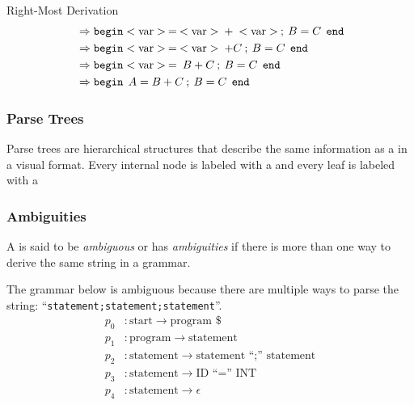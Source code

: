 \begin{example}[]{Right-Most Derivation}
\begin{align*}
                          &\Rightarrow \mathtt{begin} <\text{var}> \: = \: <\text{var}> \: + \: <\text{var}> \: ; \: B = C \:\: \mathtt{end} \\
                          &\Rightarrow \mathtt{begin} <\text{var}> \: = \: <\text{var}> \: + C \: ; \: B = C \:\: \mathtt{end} \\
                          &\Rightarrow \mathtt{begin} <\text{var}> \: = \: B + C \: ; \: B = C \:\: \mathtt{end} \\
                          &\Rightarrow \mathtt{begin} \:\: A = B + C\: ; \: B = C \:\: \mathtt{end} 
  \end{align*}
\end{example}

\subsubsection{Parse Trees}\label{subsubsec:Parse_Trees}
Parse trees are hierarchical structures that describe the same information as a  in a visual format.
Every internal node is labeled with a  and every leaf is labeled with a 

\subsubsection{Ambiguities}\label{subsubsec:Ambiguities}
\begin{definition}[Ambiguous]\label{def:Ambiguous}
  A  is said to be \emph{ambiguous} or has \emph{ambiguities} if there is more than one way to derive the same string in a grammar.

  The grammar below is ambiguous because there are multiple ways to parse the string: ``\texttt{statement;statement;statement}''.
  \begin{equation}\label{eq:Ambiguous}
    \begin{aligned}
      p_{0} &: \text{start} \rightarrow \text{program } \$ \\
      p_{1} &: \text{program} \rightarrow \text{statement} \\
      p_{2} &: \text{statement} \rightarrow \text{statement ``;'' statement} \\
      p_{3} &: \text{statement} \rightarrow \text{ID ``='' INT} \\
      p_{4} &: \text{statement} \rightarrow \epsilon \\
    \end{aligned}
  \end{equation}
\end{definition}

